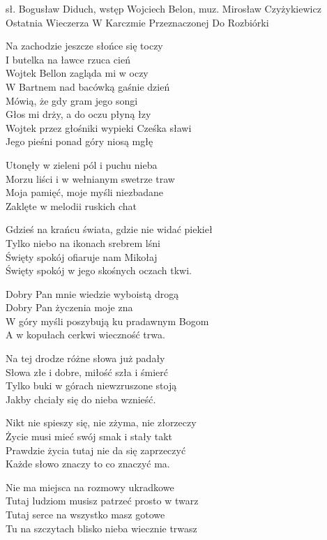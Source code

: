 {sł. Bogusław Diduch, wstęp Wojciech Belon, muz. Mirosław Czyżykiewicz}
{Ostatnia Wieczerza W Karczmie Przeznaczonej Do Rozbiórki}
\begin{text}
\hfill\break
\vin Na zachodzie jeszcze słońce się toczy\\
\vin I butelka na ławce rzuca cień\\
\vin Wojtek Bellon zagląda mi w oczy\\
\vin W Bartnem nad bacówką gaśnie dzień\\
\vin Mówią, że gdy gram jego songi\\
\vin Głos mi drży, a do oczu płyną łzy\\
\vin Wojtek przez głośniki wypieki Cześka sławi\\
\vin Jego pieśni ponad góry niosą mgłę

Utonęły w zieleni pól i puchu nieba\\
Morzu liści i w wełnianym swetrze traw\\
Moja pamięć, moje myśli niezbadane\\
Zaklęte w melodii ruskich chat

Gdzieś na krańcu świata, gdzie nie widać piekieł\\
Tylko niebo na ikonach srebrem lśni\\
Święty spokój ofiaruje nam Mikołaj\\
Święty spokój w jego skośnych oczach tkwi.

\vin Dobry Pan mnie wiedzie wyboistą drogą\\
\vin Dobry Pan życzenia moje zna\\
\vin W góry myśli poszybują ku pradawnym Bogom\\
\vin A w kopułach cerkwi wieczność trwa.

\vin Na tej drodze różne słowa już padały\\
\vin Słowa złe i dobre, miłość szła i śmierć\\
\vin Tylko buki w górach niewzruszone stoją\\
\vin Jakby chciały się do nieba wznieść.

Nikt nie spieszy się, nie zżyma, nie złorzeczy\\
Życie musi mieć swój smak i stały takt\\
Prawdzie życia tutaj nie da się zaprzeczyć\\
Każde słowo znaczy to co znaczyć ma.

Nie ma miejsca na rozmowy ukradkowe\\
Tutaj ludziom musisz patrzeć prosto w twarz\\
Tutaj serce na wszystko masz gotowe\\
Tu na szczytach blisko nieba wiecznie trwasz
\end{text}
